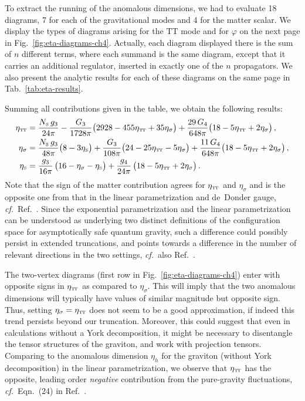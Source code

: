 \documentclass[11pt]{book} %
\newcommand\TTspace{ -1pt }
\newcommand\etaTT{ \eta_{\scriptscriptstyle{\mathrm{T\hspace{\TTspace}T}}} }
\newcommand\etaS{ \eta_{\scriptscriptstyle{\mathrm{S}}} }
\newcommand\NS{ N_{\scriptscriptstyle{\mathrm{S}}} }
\newcommand\cf{\textit{cf.}\ }
\numberwithin{equation}{chapter}
\begin{document}
To extract the running of the anomalous dimensions, we had to evaluate 18 diagrams, 7 for
each of the gravitational modes and 4 for the matter scalar. We display the types of
diagrams arising for the $\mathrm{TT}$ mode and for $\varphi$ on the next page in
Fig.~\ref{fig:eta-diagrams-ch4}.
Actually, each diagram displayed there is the sum of $n$ different terms,
where each summand is the same diagram, except that it carries an additional regulator,
inserted in exactly one of the $n$ propagators. We also present the analytic results for
each of these diagrams on the same page in Tab.~\ref{tab:eta-results}.

Summing all contributions given in the table, we obtain the following results:
\begin{align}
  \etaTT      &= \frac{\NS \, g_3}{24 \pi} - \frac{G_3}{1728 \pi} \big( 2928 - 455 \etaTT + 35 \eta_\sigma \big)
  + \frac{29 \, G_4}{648 \pi} \big( 18 - 5 \etaTT + 2 \eta_\sigma \big) \,,
  \label{etaTTcomplete} \\
  \eta_\sigma &= \frac{\NS \, g_3}{48 \pi} \big( 8-3 \etaS \big) + \frac{G_3}{108 \pi} \big( 24 - 25\etaTT - 5 \eta_\sigma \big)
   +\frac{11 \, G_4}{648 \pi} \big( 18 - 5 \etaTT + 2 \eta_\sigma \big) \,,
  \label{etasigmacomplete} \\
  \etaS &= \frac{g_3}{16\pi} \, \big(16-\eta_{\sigma}-\etaS \big)
  + \frac{g_4}{24 \pi} \, \big( 18 - 5 \etaTT + 2 \eta_{\sigma} \big) \,.
\end{align}
Note that the sign of the matter contribution agrees for $\etaTT$ and $\eta_\sigma$
and is the opposite one from that in the linear parametrization and de~Donder gauge,
\cf Ref.~\cite{Dona:2013qba}. Since the exponential parametrization and the linear parametrization
can be understood as underlying two distinct definitions of the configuration space for
asymptotically safe quantum gravity, such a difference could possibly persist in extended truncations,
and points towards a difference in the number of relevant directions in the two settings,
\cf also Ref.~\cite{Ohta:2015efa}.

The two-vertex diagrams (first row in Fig.~\ref{fig:eta-diagrams-ch4})
enter with opposite signs in $\etaTT$ as compared to $\eta_\sigma$.
This will imply that the two anomalous dimensions will typically have values of similar magnitude
but opposite sign. Thus, setting $\eta_\sigma = \etaTT$ does not seem to be a good approximation,
if indeed this trend persists beyond our truncation.
Moreover, this could suggest that even in calculations without a York decomposition,
it might be necessary to disentangle the tensor structures of the graviton,
and work with projection tensors.
Comparing to the anomalous dimension $\eta_h$ for the graviton (without York decomposition)
in the linear parametrization, we observe that $\etaTT$ has the opposite,
leading order \emph{negative} contribution from the pure-gravity fluctuations,
\cf Eqn.~(24) in Ref.~\cite{Dona:2013qba}.
\end{document}
